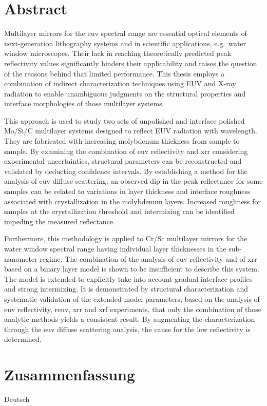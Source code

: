 \section*{Abstract}

\thispagestyle{empty}

    Multilayer mirrors for the \gls{euv} spectral range are essential optical elements of next-generation lithography systems and in scientific applications, e.g.~water window microscopes. Their lack in reaching theoretically predicted peak reflectivity values significantly hinders their applicability and raises the question of the reasons behind that limited performance. This thesis employs a combination of indirect characterization techniques using EUV and X-ray radiation to enable unambiguous judgments on the structural properties and interface morphologies of those multilayer systems.
    
    This approach is used to study two sets of unpolished and interface polished Mo/Si/C multilayer systems designed to reflect EUV radiation with  wavelength. They are fabricated with increasing molybdenum thickness from sample to sample. By examining the combination of \gls{euv} reflectivity and \gls{xrr} considering experimental uncertainties, structural parameters can be reconstructed and validated by deducting confidence intervals. By establishing a method for the analysis of \gls{euv} diffuse scattering, an observed dip in the peak reflectance for some samples can be related to variations in layer thickness and interface roughness associated with crystallization in the molybdenum layers. Increased roughness for samples at the crystallization threshold and intermixing can be identified impeding the measured reflectance.
    
    Furthermore, this methodology is applied to Cr/Sc multilayer mirrors for the water window spectral range having individual layer thicknesses in the sub-nanometer regime. The combination of the analysis of \gls{euv} reflectivity and of \gls{xrr} based on a binary layer model is shown to be insufficient to describe this system. The model is extended to explicitly take into account gradual interface profiles and strong intermixing. It is demonstrated by structural characterization and systematic validation of the extended model parameters, based on the analysis of \gls{euv} reflectivity, \gls{reuv}, \gls{xrr} and \gls{xrf} experiments, that only the combination of those analytic methods yields a consistent result. By augmenting the characterization through the \gls{euv} diffuse scattering analysis, the cause for the low reflectivity is determined.

\cleardoublepage

\thispagestyle{empty}

\section*{Zusammenfassung}
    
    Deutsch

\cleardoublepage
